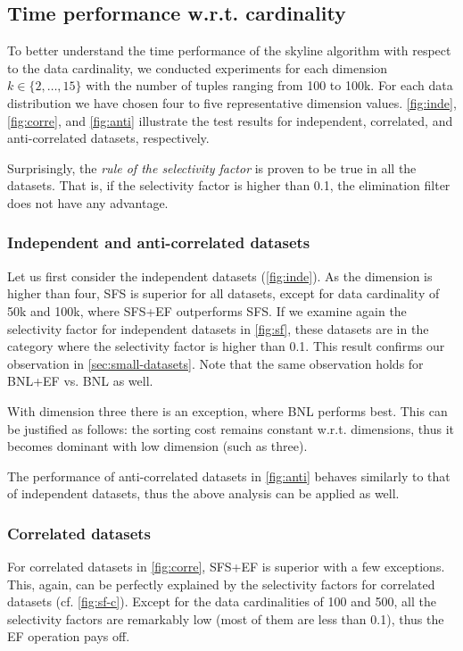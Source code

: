 \subsection{Time performance w.r.t. cardinality}

To better understand the time performance of the skyline algorithm
with respect to the data cardinality, we conducted experiments for
each dimension $k \in \{2, \ldots, 15\}$ with the number of tuples
ranging from 100 to 100k.  For each data distribution we have chosen
four to five representative dimension values.  \autoref{fig:inde},
\ref{fig:corre}, and \ref{fig:anti} illustrate the test results for
independent, correlated, and anti-correlated datasets, respectively.

Surprisingly, the \emph{rule of the selectivity factor} is proven to
be true in all the datasets.  That is, if the selectivity factor is
higher than 0.1, the elimination filter does not have any advantage.

\subsubsection{Independent and anti-correlated datasets}
Let us first consider the independent datasets
(\autoref{fig:inde}).  As the dimension is higher than four, SFS is
superior for all datasets, except for data cardinality of 50k and
100k, where SFS+EF outperforms SFS.  If we examine again the
selectivity factor for independent datasets in \autoref{fig:sf},
these datasets are in the category where the selectivity factor is
higher than 0.1. This result confirms our observation in
\autoref{sec:small-datasets}.  Note that the same observation
holds for BNL+EF vs. BNL as well.

With dimension three there is an exception, where BNL performs best.
This can be justified as follows: the sorting cost remains constant
w.r.t. dimensions, thus it becomes dominant with low dimension (such
as three).

The performance of anti-correlated datasets in \autoref{fig:anti}
behaves similarly to that of independent datasets, thus the above
analysis can be applied as well.

\subsubsection{Correlated datasets}
For correlated datasets in \autoref{fig:corre}, SFS+EF is superior
with a few exceptions. This, again, can be perfectly explained by the
selectivity factors for correlated datasets
(cf. \autoref{fig:sf-c}).  Except for the data cardinalities of 100
and 500, all the selectivity factors are remarkably low (most of them
are less than 0.1), thus the EF operation pays off.

